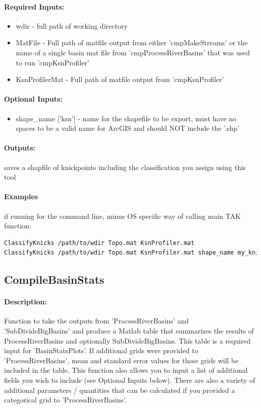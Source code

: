 \paragraph{Required Inputs:}
\begin{itemize}
	\item wdir - full path of working directory
	\item MatFile - Full path of matfile output from either 'cmpMakeStreams' or the name of a single basin mat file from 
	'cmpProcessRiverBasins' that was used to run 'cmpKsnProfiler'
	\item KsnProfilerMat - Full path of matfile output from 'cmpKsnProfiler'
\end{itemize}

\paragraph{Optional Inputs:}
\begin{itemize}
\item shape\_name ['ksn'] - name for the shapefile to be export, must have no spaces to be a valid name for ArcGIS and should NOT include the '.shp'
\end{itemize}

\paragraph{Outputs:}
saves a shapfile of knickpoints including the classification you assign using this tool

\paragraph{Examples} if running for the command line, minus OS specific way of calling main TAK function:
\begin{lstlisting}[language=bash]
ClassifyKnicks /path/to/wdir Topo.mat KsnProfiler.mat
ClassifyKnicks /path/to/wdir Topo.mat KsnProfiler.mat shape_name my_knicks
\end{lstlisting}

\subsection{CompileBasinStats}
\paragraph{Description:}
Function to take the outputs from 'ProcessRiverBasins' and 'SubDivideBigBasins' and produce a Matlab table that summarizes the results of ProcessRiverBasins
and optionally SubDivideBigBasins. This table is a required input for 'BasinStatsPlots'. If additional grids were provided to 'ProcessRiverBasins', mean and 
standard error values for those grids will be included in the table. This function also allows you to input a list of additional fields you wish to include 
(see Optional Inputs below). There are also a variety of additional parameters / quantities that can be calculated if you provided a categorical grid
to 'ProcessRiverBasins'.


